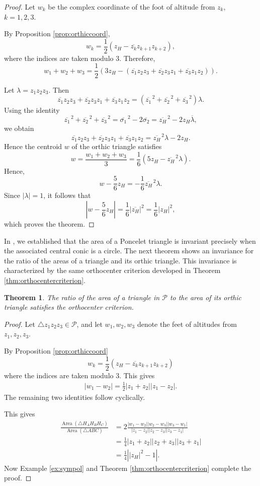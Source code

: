 \documentclass[11pt,reqno]{amsart}
\newtheorem{theorem}{Theorem}[section]
\theoremstyle{definition}
\numberwithin{equation}{section}
\begin{document}
\begin{proof}
Let $w_k$ be the complex coordinate of the foot of altitude from $z_k$, $k=1,2,3$. 

By Proposition \ref{prop:orthiccoord},
\[
w_k
=
\frac12
\left(
z_H-\overline{z_k}z_{k+1}z_{k+2}
\right),
\]
where the indices are taken modulo $3$. Therefore,
\[
w_1+w_2+w_3
=
\frac12
\left(
3z_H-
\left(
\overline{z_1}z_2z_3
+\overline{z_2}z_3z_1
+\overline{z_3}z_1z_2
\right)
\right).
\]

Let $\lambda=z_1z_2z_3$. Then
\[
\overline{z_1}z_2z_3
+\overline{z_2}z_3z_1
+\overline{z_3}z_1z_2
=
\left(\overline{z_1}^{\,2}
+\overline{z_2}^{\,2}
+\overline{z_3}^{\,2}\right) \lambda.
\]
Using the identity
\[
\overline{z_1}^{\,2}
+\overline{z_2}^{\,2}
+\overline{z_3}^{\,2}
=
\overline{\sigma_1}^{\,2}
-
2\overline{\sigma_2}
=
\overline{z_H}^{\,2}
-
2z_H\overline{\lambda},
\]
we obtain
\[
\overline{z_1}z_2z_3
+\overline{z_2}z_3z_1
+\overline{z_3}z_1z_2
=
\overline{z_H}^{\,2}\lambda
-
2z_H.
\]
Hence the centroid $w$ of the orthic triangle satisfies
\[
w
=
\frac{w_1+w_2+w_3}{3}
=
\frac16
\left(
5z_H-\overline{z_H}^{\,2}\lambda
\right).
\]
Hence,
\[
w-\frac56z_H
=
-\frac16\overline{z_H}^{\,2}\lambda.
\]
Since $|\lambda|=1$, it follows that
\[
\left|w-\frac56z_H\right|
=
\frac16|\overline{z_H}|^2
=
\frac16|z_H|^2,
\]
which proves the theorem.
\end{proof}

In \cite{Dragovic-Murad2026}, we established that the area of a Poncelet triangle is invariant precisely when the associated central conic is a circle. The next theorem shows an invariance for the ratio of the areas of a triangle and its orthic triangle. This invariance is characterized by the same orthocenter criterion developed in Theorem \ref{thm:orthocentercriterion}.

\begin{theorem}\label{thm:orthicarearatio}
The ratio of the area of a triangle in $\mathcal P$ to the area of its orthic triangle satisfies the orthocenter criterion.
\end{theorem}
\begin{proof} Let $\triangle z_1z_2z_3\in\mathcal P$, and let $w_1,w_2,w_3$ denote the feet of altitudes from $z_1,z_2,z_3$.

By Proposition \ref{prop:orthiccoord}
\[
w_k=\frac{1}{2}(z_H-\overline{z_k}z_{k+1}z_{k+2})
\]
where the indices are taken modulo 3. This gives
    \begin{align*}
    |w_1-w_2|=\frac{1}{2}|z_1+z_2||z_1-z_2|.
\end{align*}
The remaining two identities follow cyclically.

This gives
\begin{align*}
    \frac{\operatorname{Area}(\triangle H_AH_BH_C)}{\operatorname{Area}(\triangle ABC)}&=2\frac{|w_1-w_2||w_2-w_3||w_3-w_1|}{|z_1-z_2||z_2-z_3||z_3-z_1|}\\
    &=\frac{1}{4}|z_1+z_2||z_2+z_3||z_3+z_1|\\
    &=\frac{1}{4} \left||z_H|^2-1\right|.
\end{align*}
Now Example \ref{ex:sympol} and Theorem \ref{thm:orthocentercriterion} complete the proof.
\end{proof}
\end{document}
